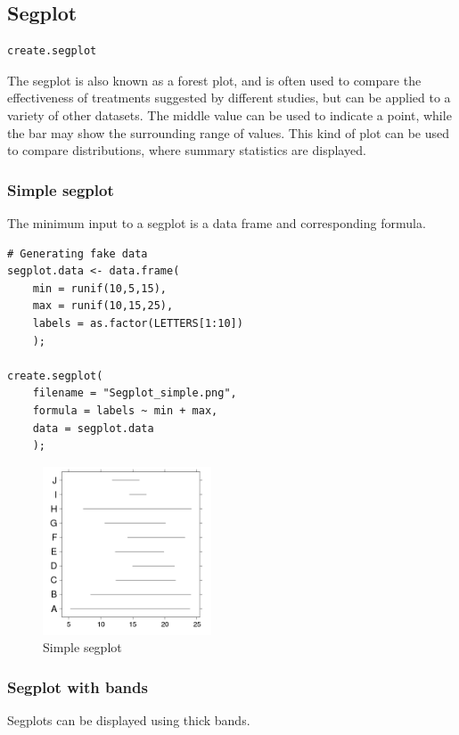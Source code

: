 \documentclass[letterpaper]{article}
\begin{document}
\subsection{Segplot}
\begin{verbatim}
create.segplot
\end{verbatim}

The segplot is also known as a forest plot, and is often used to compare the effectiveness of treatments suggested by different studies, but can be applied to a variety of other datasets. The middle value can be used to indicate a point, while the bar may show the surrounding range of values. This kind of plot can be used to compare distributions, where summary statistics are displayed.

\subsubsection{Simple segplot}
The minimum input to a segplot is a data frame and corresponding formula.

\begin{verbatim}
# Generating fake data
segplot.data <- data.frame(
    min = runif(10,5,15),
    max = runif(10,15,25),
    labels = as.factor(LETTERS[1:10])
    );

create.segplot(
    filename = "Segplot_simple.png",
    formula = labels ~ min + max,
    data = segplot.data
    );
\end{verbatim}

\begin{figure}[!ht]
  \begin{center}
     \includegraphics[width=50mm]{Figures/Segplot_simple.png}
     \caption{Simple segplot}
  \end{center}
\end{figure}

\subsubsection{Segplot with bands}
Segplots can be displayed using thick bands.
\end{document}
